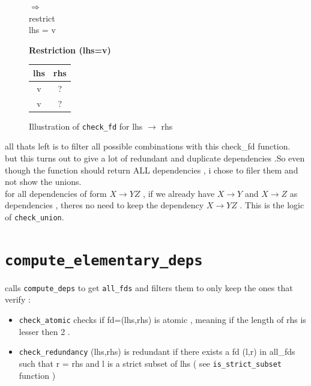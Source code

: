 \documentclass[11pt]{article}
\begin{document}
\begin{figure}[h]
\begin{minipage}{0.05\textwidth}
    \centering
    $\Rightarrow$\\
    \small restrict\\
    lhs = v
    \end{minipage}
    \hfill
    \begin{minipage}{0.2\textwidth}
    \centering
    \textbf{Restriction (lhs=v)}\\[0.5em]
    \begin{tabular}{|c|c|}
    \hline
    \textbf{lhs} & \textbf{rhs} \\
    \hline
    v & ? \\
    v & ? \\
    \hline
    \end{tabular}
\end{minipage}

\caption{Illustration of \texttt{check\_fd} for lhs $\rightarrow$ rhs}
\end{figure}

all thats left is to filter all possible combinations with this check\_fd function.\\

but this turns out to give a lot of redundant and duplicate dependencies .So even though the function should return ALL dependencies , i chose to filer them and not show the unions.
\\ for all dependencies of form $X\rightarrow YZ$ , if we already have $X\rightarrow Y$ and $X\rightarrow Z$ as dependencies , theres no need to keep the dependency $X\rightarrow YZ$ . This is the logic of \texttt{check\_union}.

\section{\texttt{compute\_elementary\_deps}}

calls \texttt{compute\_deps} to get \texttt{all\_fds} and filters them to only keep the ones that verify : 

\begin{itemize}
    \item \texttt{check\_atomic} checks if fd=(lhs,rhs) is atomic , meaning if the length of rhs is lesser then 2 . 

    \item \texttt{check\_redundancy} (lhs,rhs) is redundant if there exists a fd (l,r) in all\_fds such that r = rhs and l is a strict subset of lhs ( see \texttt{is\_strict\_subset} function )
\end{itemize}
\end{document}
